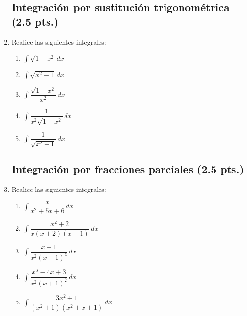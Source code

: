 \documentclass[letterpaper]{article}
\renewcommand{\*}{\cdot}
\theoremstyle{definition}
\begin{document}
\begin{enumerate}
\subsection*{Integración por sustitución trigonométrica (2.5 pts.)}
\item  Realice las siguientes integrales:
\begin{enumerate}
\item$\displaystyle \int \sqrt{1 - x^2} \, dx$
\item$\displaystyle \int \sqrt{x^2 - 1} \, dx$
\item$\displaystyle \int \dfrac{\sqrt{1 - x^2}}{x^2} \, dx$
\item$\displaystyle \int  \dfrac{1}{x^2 \sqrt{1 - x^2}} \, dx$
\item$\displaystyle \int  \dfrac{1}{ \sqrt{x^2 - 1}} \, dx$
\end{enumerate}

\subsection*{Integración por fracciones parciales (2.5 pts.)}
\item  Realice las siguientes integrales:
\begin{enumerate}
\item$\displaystyle \int \dfrac{x}{x^2 + 5x + 6} \, dx$
\item$\displaystyle \int \dfrac{x^2 +2}{x(x+2)(x-1)} \, dx$
\item$\displaystyle \int \dfrac{x + 1}{x^2(x-1)^3} \, dx$
\item$\displaystyle \int \dfrac{x^3 - 4x + 3}{x^2(x+1)^2} \, dx$
\item$\displaystyle \int  \dfrac{3x^2 + 1}{(x^2 +1 ) (x^2 + x +1)} \, dx$
\end{enumerate}

 \end{enumerate}
\end{document}
